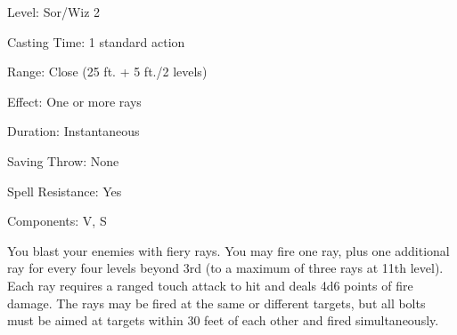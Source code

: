 
\begin{description*}
\item[Level:] Sor/Wiz 2
\item[Casting Time:] 1 standard action
\item[Range:] Close (25 ft. + 5 ft./2 levels)
\item[Effect:] One or more rays
\item[Duration:] Instantaneous
\item[Saving Throw:] None
\item[Spell Resistance:] Yes
\item[Components:] V, S
\end{description*}

You blast your enemies with fiery rays. You may fire one ray, plus one additional
ray for every four levels beyond 3rd (to a maximum of three rays at 11th level).
Each ray requires a ranged touch attack to hit and deals 4d6 points of fire damage.
The rays may be fired at the same or different targets, but all bolts must be aimed
at targets within 30 feet of each other and fired simultaneously.
